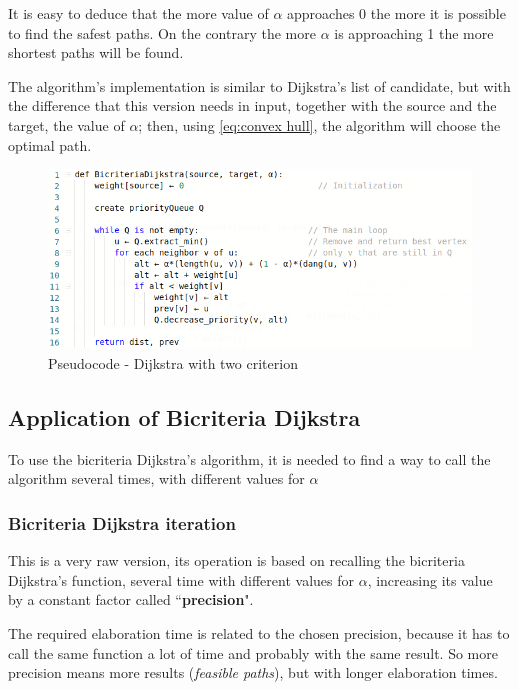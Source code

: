 \documentclass[a4paper,11pt]{report}
\begin{document}
It is easy to deduce that the more value of $\alpha$ approaches $0$ the more it is possible to find the safest paths. On the contrary the more $\alpha$ is approaching 1 the more shortest paths will be found.

\vspace{5mm}

The algorithm's implementation is similar to Dijkstra's list of candidate, but with the difference that this version needs in input, together with the source and the target, the value of $\alpha$; then, using \eqref{eq:convex hull}, the algorithm will choose the optimal path.

\begin{figure}[h]
	\centering
	\includegraphics[width=\linewidth]{img/bicriteriaDijkstra.png}
	\caption{Pseudocode - Dijkstra with two criterion}
	\label{fig:bicriteriaDijkstra}
\end{figure}

\subsection{Application of Bicriteria Dijkstra}
To use the bicriteria Dijkstra's algorithm, it is needed to find a way to call the algorithm several times, with different values for $\alpha$

\subsubsection{Bicriteria Dijkstra iteration}
This is a very raw version, its operation is based on recalling the bicriteria Dijkstra's function, several time with different values for $\alpha$, increasing its value by a constant factor called ``\textbf{precision}".

The required elaboration time is related to the chosen precision, because it has to call the same function a lot of time and probably with the same result. So more precision means more results (\textit{feasible paths}), but with longer elaboration times.
\end{document}
